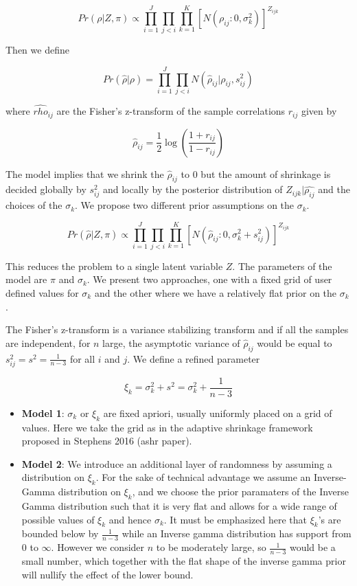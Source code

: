 \documentclass[12pt]{article}
\begin{document}
$$ Pr \left ( \rho |  Z, \pi  \right )  \propto \prod_{i=1}^{J} \prod_{j < i} \prod_{k=1}^{K} \left [ N \left (\rho_{ij} : 0, \sigma^2_{k} \right ) \right ]^{Z_{ijk}}  $$

Then we define 

$$ Pr \left (\hat{\rho} | \rho \right ) = \prod_{i=1}^{J} \prod_{j < i } N \left (\hat{\rho}_{ij} | \rho_{ij}, s^2_{ij} \right)  $$

where $\hat{rho}_{ij}$ are the Fisher's z-transform of the sample correlations $r_{ij}$ given by 

$$  \hat{\rho}_{ij} = \frac{1}{2} \log \left ( \frac{1+r_{ij}}{1- r_{ij}} \right )  $$

The model implies that we shrink the $ \hat{\rho}_{ij}$ to $0$ but the amount of shrinkage is decided globally by $s^2_{ij}$ and locally by the posterior distribution of $Z_{ijk} | \hat{\rho_{ij}} $ and the choices of the $\sigma_{k}$. We propose two different prior assumptions on the $\sigma_{k}$.


$$ Pr \left ( \hat{\rho} |  Z, \pi  \right )  \propto \prod_{i=1}^{J} \prod_{j < i} \prod_{k=1}^{K} \left [ N \left (\hat{\rho}_{ij} : 0, \sigma^2_{k} + s^{2}_{ij} \right ) \right ]^{Z_{ijk}}  $$

This reduces the problem to a single latent variable $Z$. The parameters of the model are $\pi$ and $\sigma_{k}$. We present two approaches, one with a fixed grid of user defined values for $\sigma_{k}$ and the other where we have a relatively flat prior on the $\sigma_{k}$. 

The Fisher's z-transform is a variance stabilizing transform and if all the samples are independent, for $n$ large, the asymptotic variance of $\hat{\rho}_{ij}$  would be equal to $ s^2_{ij} = s^2 = \frac{1}{n-3}$ for all $i$ and $j$. We define a refined parameter 

$$ \xi_{k}= \sigma^2_{k} + s^2 = \sigma^2_{k} + \frac{1}{n-3}  $$


\begin{itemize}

\item \textbf{Model 1}:  $\sigma_{k}$ or $\xi_{k}$ are fixed apriori, usually uniformly placed on a grid of values. Here we take the grid as in the adaptive shrinkage framework proposed in Stephens 2016 (ashr paper).

\item \textbf{Model 2}: We introduce an additional layer of randomness by assuming a distribution on $\xi_{k}$. For the sake of technical advantage we assume an Inverse-Gamma distribution on $\xi_{k}$, and we choose the prior paramaters of the Inverse Gamma distribution such that it is very flat and allows for a wide range of possible values of $\xi_{k}$ and hence $\sigma_{k}$. It must be emphasized here that $\xi_{k}$'s are bounded below by $\frac{1}{n-3}$ while an Inverse gamma distribution has support from $0$ to $\infty$. However we consider $n$ to be moderately large, so $\frac{1}{n-3}$ would be a small number, which together with the flat shape of the inverse gamma prior will nullify the effect of the lower bound.



\end{itemize}
\end{document}
